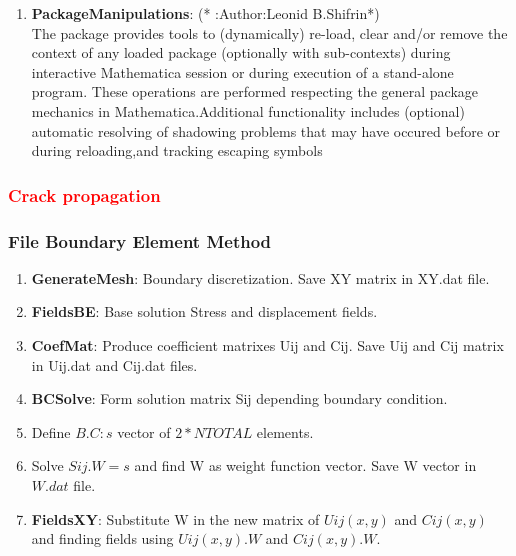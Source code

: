 \documentclass[12pt]{article}
\numberwithin{equation}{subsection}
\begin{document}
\begin{enumerate}
\item \textbf{PackageManipulations}: 
(* :Author:Leonid B.Shifrin*)\\
The package provides tools to (dynamically) re-load, clear and/or remove the context of any loaded package (optionally with sub-contexts) during interactive Mathematica session or during execution of a stand-alone program. These operations are performed respecting the general package mechanics in Mathematica.Additional functionality includes (optional) automatic resolving of shadowing problems that may have occured before or during reloading,and tracking escaping symbols 

\end{enumerate}

\clearpage
\subsubsection{\textcolor{red}{Crack propagation}}

\clearpage
\subsubsection{File Boundary Element Method}

\begin{enumerate}

\item  \textbf{GenerateMesh}: Boundary discretization. Save XY matrix in XY.dat file.

\item  \textbf{FieldsBE}:     Base solution Stress and displacement fields.

\item  \textbf{CoefMat}:      Produce coefficient matrixes Uij and Cij. Save Uij and Cij matrix in Uij.dat and Cij.dat files.

\item  \textbf{BCSolve}:      Form solution matrix Sij depending boundary condition.

\item Define $B.C: s$ vector of $2*NTOTAL$ elements.

\item Solve $Sij.W = s$ and find W as weight function vector. Save W vector in $W.dat$ file.

\item  \textbf{FieldsXY}:   Substitute W in the new matrix of $Uij(x,y)$ and $Cij(x,y)$ and finding fields using $Uij(x,y).W$ and $Cij(x,y).W$.
\end{enumerate}
\end{document}
